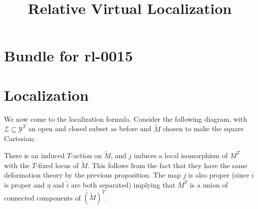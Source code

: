 \documentclass[12pt,dvipsnames]{amsart}
\title{Relative Virtual Localization}
\begin{document}
\section*{Bundle for rl-0015}

\section{Localization}\label{rl-0015}

We now come to the localization formula. Consider the following diagram, with \(\mathcal Z\subseteq \mathcal Y^T\) an open and closed subset as before and \(\widetilde M\) chosen to make the square Cartesian:

\begin{center}
\end{center}
There is an induced \(T\)-action on \(\widetilde{M}\), and \(j\) induces a local isomorphism of \(M^T\) with the \(T\)-fixed locus of \(\widetilde{M}\). This follows from the fact that they have the same deformation theory by the previous proposition. The map \(j\) is also proper (since \(i\) is proper and \(\eta\) and \(\tilde i\) are both separated) implying that \(M^T\) is a union of connected components of \((\widetilde{M})^T\).


\end{document}

